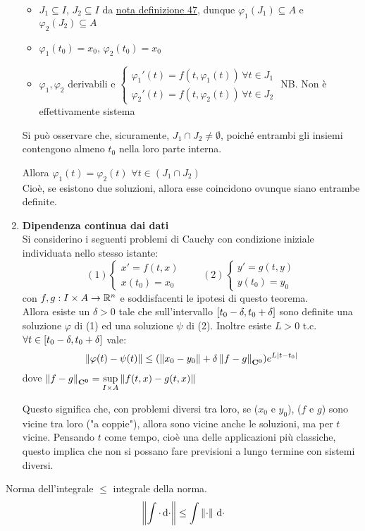 \begin{theorem}
\begin{enumerate}
		\begin{itemize}
			\item $J_1\subseteq I$, $J_2\subseteq I$ da \hyperlink{note:diff_eq_sol_definit_set}{nota definizione 47}, dunque $\varphi_1(J_1)\subseteq A$ e $\varphi_2(J_2)\subseteq A$
			\item $\varphi_1(t_0)=x_0,\,\varphi_2(t_0)=x_0$
			\item $\varphi_1,\varphi_2$ derivabili e
				$\begin{cases}
					\varphi_1'(t)=f(t,\varphi_1(t))\,\forall t \in J_1\\
					\varphi_2'(t)=f(t,\varphi_2(t))\,\forall t \in J_2
				\end{cases}$
				NB. Non è effettivamente sistema
		\end{itemize}
		\begin{note}
			Si può osservare che, sicuramente, $J_1\cap J_2\neq\emptyset$, poiché entrambi gli insiemi contengono almeno $t_0$ nella loro parte interna.
		\end{note}
		Allora $\varphi_1(t)=\varphi_2(t)$ $\forall t \in(J_1\cap J_2)$\\
		Cioè, se esistono due soluzioni, allora esse coincidono ovunque siano entrambe definite.
		\item \textbf{Dipendenza continua dai dati}\\
		Si considerino i seguenti problemi di Cauchy con condizione iniziale individuata nello stesso istante:
		$$(1)\begin{cases}x'=f(t,x)\\x(t_0)=x_0\end{cases}\qquad
		(2)\begin{cases}y'=g(t,y)\\y(t_0)=y_0\end{cases}$$
		con $f,g:I\times A \to \mathbb{R}^n$ e soddisfacenti le ipotesi di questo teorema.\\
		Allora esiste un $\delta >0$ tale che sull'intervallo $\left[t_0-\delta,t_0+\delta\right]$ sono definite una soluzione $\varphi$ di (1) ed una soluzione $\psi$ di (2). Inoltre esiste $L>0$ t.c. $\forall t\in \left[t_0-\delta,t_0+\delta\right]$ vale:
		$$\left\|\varphi(t)-\psi(t)\right\| \le (\left\|x_0-y_0\right\|+\delta\left\|f-g\right\|_{\mathbf{C^{0}}})e^{L\left|t-t_0\right|}$$
		dove $\left\|f-g\right\|_{\mathbf{C^{0}}}=\sup\limits_{I\times A}\left\|f(t,x)-g(t,x)\right\|$
		\begin{note}
			Questo significa che, con problemi diversi tra loro, se ($x_0$ e $y_0$), ($f$ e $g$) sono vicine tra loro ("a coppie"), allora sono vicine anche le soluzioni, ma per $t$ vicine.
			Pensando $t$ come tempo, cioè una delle applicazioni più classiche, questo implica che non si possano fare previsioni a lungo termine con sistemi diversi.
		\end{note}
	\end{enumerate}
\end{theorem}
\begin{note}
	Norma dell'integrale $\leq$ integrale della norma.
	$$\left\|\int{\cdot}\,\mathrm{d}{\cdot}\right\|\leq\int{\left\|\cdot\right\|\,\mathrm{d}{\cdot}}$$
\end{note}

